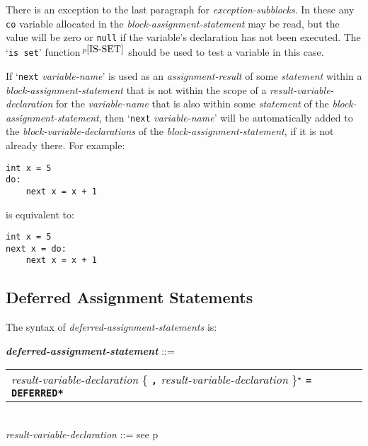 \documentclass[12pt]{article}
\newcommand{\TT}[1]{{\tt \bfseries #1}}
\newcommand{\STAR}{{\Large $^\star$}}
\newcommand{\ttkey}[1]{{\tt \bfseries #1}}
\newcommand{\emkey}[1]{{\em \bfseries #1}}
\newcommand{\pagref}[1]{p\pageref{#1}}
\newcommand{\pagnote}[1]{$\,^{p\pageref{#1}}$}
\newenvironment{indpar}[1][0.3in]%
	{\begin{list}{}%
		     {\setlength{\itemsep}{0in}%
		      \setlength{\topsep}{0in}%
		      \setlength{\parsep}{1ex}%
		      \setlength{\labelwidth}{#1}%
		      \setlength{\leftmargin}{#1}%
		      \addtolength{\leftmargin}{\labelsep}}%
	 \item}%
	{\end{list}}
\begin{document}
There is an exception to the last paragraph for {\em exception-subblocks}.
In these any {\tt co} variable allocated in the
{\em block-assignment-statement} may be read, but the value will
be zero or {\tt null} if the variable's declaration has not been
executed.  The `{\tt is set}' function\pagnote{IS-SET} should be
used to test a variable in this case.

If\label{BLOCK-NEXT-PROMOTION} `{\tt next} {\em variable-name}' is used as an
{\em assignment-result} of some {\em statement} within a
{\em block-assignment-statement} that is not within the scope of
a {\em result-variable-declaration} for the {\em variable-name}
that is also within some {\em statement} of the
{\em block-assignment-statement},
then `{\tt next} {\em variable-name}' will be automatically added
to the {\em block-variable-declarations}
of the {\em block-assignment-state\-ment},
if it is not already there.  For example:
\begin{indpar}\begin{verbatim}
int x = 5
do:
    next x = x + 1
\end{verbatim}\end{indpar}
is equivalent to:
\begin{indpar}\begin{verbatim}
int x = 5
next x = do:
    next x = x + 1
\end{verbatim}\end{indpar}

\subsection{Deferred Assignment Statements}
\label{DEFERRED-ASSIGNMENT-STATEMENTS}

The syntax of {\em defer\-red-assignment-state\-ments} is:

\begin{indpar}
\emkey{deferred-assignment-statement} ::= \\
\hspace*{0.3in}
    \begin{tabular}[t]{@{}l}
        {\em result-variable-declaration}
                \{ \TT{,} {\em result-variable-declaration} \}\STAR{}
		     \TT{=} \ttkey{*DEFERRED*} \\
    \end{tabular}
\\[0.5ex]
{\em result-variable-declaration} ::=
    see \pagref{RESULT-VARIABLE-DECLARATION}
\end{indpar}
\end{document}
